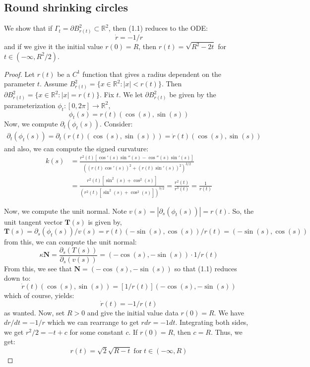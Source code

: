 \documentclass{article}
\begin{document}
\subsection{Round shrinking circles}
We show that if $\Gamma_t = \partial B^2_{r(t)}\subset\mathbb{R}^2$, then (1.1) reduces to the ODE:
\[ \dot{r} = -1/r \]
and if we give it the initial value $r(0) = R$, then $r(t) = \sqrt{R^2 - 2t}$ for $t\in(-\infty,R^2/2)$.
\begin{proof}
    Let $r(t)$ be a $C^1$ function that gives a radius dependent on the parameter $t$.
    Assume $B^2_{r(t)} = \{x\in\mathbb{R}^2: |x|< r(t)\}$. Then $\partial B^2_{r(t)} = \{x\in\mathbb{R}^2:|x|=r(t)\}$.
    Fix $t$. We let $\partial B^2_{r(t)}$ be given by the parameterization $\phi_t: [0,2\pi]\to\mathbb{R}^2$,
    \[ \phi_t(s) = r(t)(\cos(s),\sin(s))\]
    Now, we compute $\partial_t(\phi_t(s))$. Consider:
    \begin{align*}
        \partial_t(\phi_t(s)) = \partial_t(r(t)(\cos(s),\sin(s))) = \dot{r}(t)(\cos(s),\sin(s))
    \end{align*}
    and also, we can compute the signed curvature:
    \begin{align*}
        k(s) &= \frac{r^2(t)[\cos'(s)\sin''(s)-\cos''(s)\sin'(s)]}{((r(t)\cos'(s))^2+(r(t)\sin'(s))^2)^{3/2}} \\
        	       &= \frac{r^2(t)[\sin^2(s) + \cos^2(s)]}{(r^2(t)[\sin^2(s) + \cos^2(s)])^{3/2}} = \frac{r^2(t)}{r^3(t)} = \frac{1}{r(t)}
    \end{align*}
    
    Now, we compute the unit normal. Note $v(s) = |\partial_s(\phi_t(s))| = r(t)$. So, the unit tangent vector $\mathbf{T}(s)$ is given by,
    \[ \mathbf{T}(s) = \partial_s(\phi_t(s))/v(s) = r(t)(-\sin(s),\cos(s))/r(t) = (-\sin(s),\cos(s))\]
    from this, we can compute the unit normal:
    \[ \kappa\mathbf{N} = \frac{\partial_s(T(s))}{\partial_s(v(s))} = (-\cos(s),-\sin(s))\cdot 1/r(t)   \]
    From this, we see that $\mathbf{N} = (-\cos(s),-\sin(s))$ so that (1.1) reduces down to:
    \[ \dot{r}(t)(\cos(s),\sin(s))  = [1/r(t)](-\cos(s),-\sin(s)) \]
    which of course, yields:
    \[ \dot{r}(t) = -1/r(t) \]
    as wanted. Now, set $R > 0$ and give the initial value data $r(0) = R$. We have $dr/dt = -1/r$ which we can rearrange to get $r dr = -1 dt$.
    Integrating both sides, we get $r^2/2 = -t + c$ for some constant $c$. If $r(0) = R$, then $c = R$. Thus, we get:
    \[ r(t) = \sqrt{2}\sqrt{R-t} \;\text{for}\;t\in (-\infty, R)\]
\end{proof}
\end{document}
